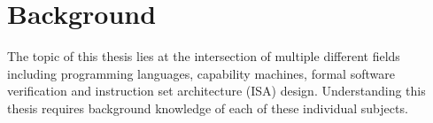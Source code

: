\chapter{Background}
\label{cha:litrev}
The topic of this thesis lies at the intersection of multiple different fields including programming languages, capability machines, formal software verification and instruction set architecture (ISA) design. Understanding this thesis requires background knowledge of each of these individual subjects.




%

